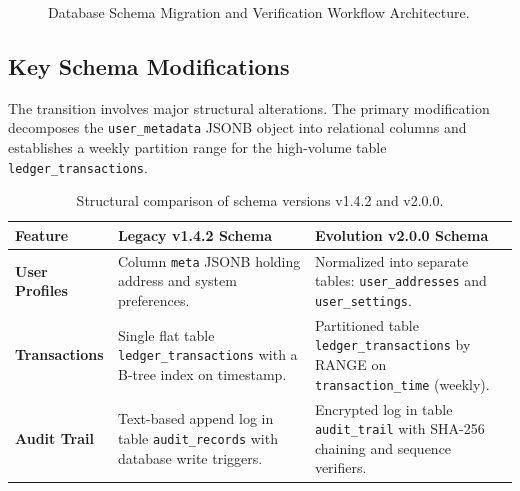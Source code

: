 \begin{figure}[htbp]
\caption{Database Schema Migration and Verification Workflow Architecture.}
\label{fig:migration_architecture}
\end{figure}

\subsection{Key Schema Modifications}
The transition involves major structural alterations. The primary modification decomposes the \texttt{user\_metadata} JSONB object into relational columns and establishes a weekly partition range for the high-volume table \texttt{ledger\_transactions}.

\begin{table}[h]
\small
\centering
\begin{tabularx}{\textwidth}{L{2.8cm} Y Y}
\toprule
\textbf{Feature} & \textbf{Legacy v1.4.2 Schema} & \textbf{Evolution v2.0.0 Schema} \\
\midrule
\textbf{User Profiles} & Column \texttt{meta} JSONB holding address and system preferences. & Normalized into separate tables: \texttt{user\_addresses} and \texttt{user\_settings}. \\
\midrule
\textbf{Transactions} & Single flat table \texttt{ledger\_transactions} with a B-tree index on timestamp. & Partitioned table \texttt{ledger\_transactions} by RANGE on \texttt{transaction\_time} (weekly). \\
\midrule
\textbf{Audit Trail} & Text-based append log in table \texttt{audit\_records} with database write triggers. & Encrypted log in table \texttt{audit\_trail} with SHA-256 chaining and sequence verifiers. \\
\bottomrule
\end{tabularx}
\caption{Structural comparison of schema versions v1.4.2 and v2.0.0.}
\label{tab:schema_comparison}
\end{table}

